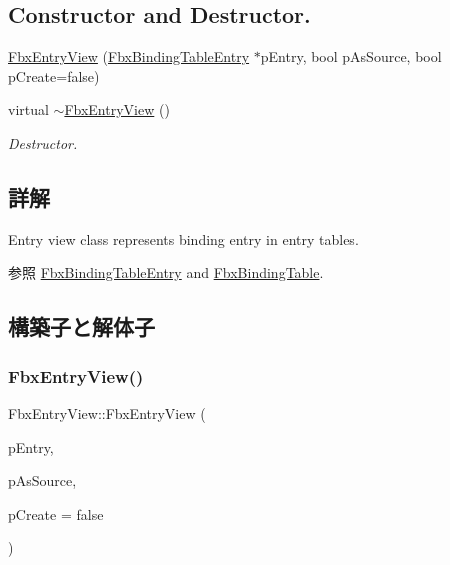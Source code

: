 \subsection*{Constructor and Destructor.}
\begin{DoxyCompactItemize}
\item 
\hyperlink{class_fbx_entry_view_a16e4c36a79ae38f1fc4b31973f43c15c}{Fbx\+Entry\+View} (\hyperlink{class_fbx_binding_table_entry}{Fbx\+Binding\+Table\+Entry} $\ast$p\+Entry, bool p\+As\+Source, bool p\+Create=false)
\item 
virtual \hyperlink{class_fbx_entry_view_a8adf9f4b899377fef920fd7b5e2bfcbf}{$\sim$\+Fbx\+Entry\+View} ()
\begin{DoxyCompactList}\small\item\em Destructor. \end{DoxyCompactList}\end{DoxyCompactItemize}


\subsection{詳解}
Entry view class represents binding entry in entry tables. \begin{DoxySeeAlso}{参照}
\hyperlink{class_fbx_binding_table_entry}{Fbx\+Binding\+Table\+Entry} and \hyperlink{class_fbx_binding_table}{Fbx\+Binding\+Table}. 
\end{DoxySeeAlso}


\subsection{構築子と解体子}
\mbox{\label{class_fbx_entry_view_a16e4c36a79ae38f1fc4b31973f43c15c}} 
\subsubsection{\texorpdfstring{Fbx\+Entry\+View()}{FbxEntryView()}}
{\footnotesize\ttfamily Fbx\+Entry\+View\+::\+Fbx\+Entry\+View (\begin{DoxyParamCaption}\item[{\hyperlink{class_fbx_binding_table_entry}{Fbx\+Binding\+Table\+Entry} $\ast$}]{p\+Entry,  }\item[{bool}]{p\+As\+Source,  }\item[{bool}]{p\+Create = {\ttfamily false} }\end{DoxyParamCaption})}

